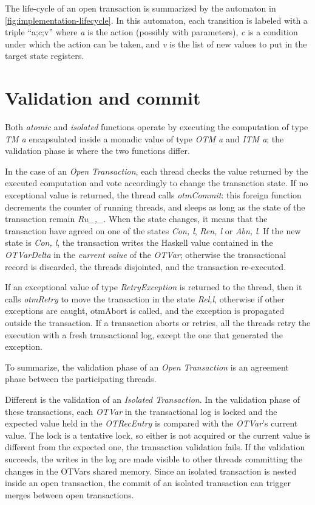 The life-cycle of an open transaction is summarized by the automaton in \cref{fig:implementation-lifecycle}.
In this automaton, each transition is labeled with a triple ``a;c;v'' where \emph{a} is the action (possibly with parameters), \emph{c} is a condition under which the action can be taken, and \emph{v} is the list of new values to put in the target state registers.



\section{Validation and commit}

Both \emph{atomic} and \emph{isolated} functions operate by executing the computation of type \emph{TM a} encapsulated inside a monadic value of type \emph{OTM a} and \emph{ITM a}; the validation phase is where the two functions differ.

In the case of an \emph{Open Transaction}, each thread checks the value returned by the executed computation and vote accordingly to change the transaction state.
If no exceptional value is returned, the thread calls \emph{otmCommit}: this foreign function decrements the counter of running threads, and sleeps as long as the state of the transaction remain \emph{Ru\textlangle \_,\_\textrangle}.
When the state changes, it means that the transaction have agreed on one of the states \emph{Co\textlangle n, l\textrangle}, \emph{Re\textlangle n, l\textrangle} or \emph{Ab\textlangle n, l\textrangle}.
If the new state is \emph{Co\textlangle n, l\textrangle}, the transaction writes the Haskell value contained in the \emph{OTVarDelta} in the \emph{current value} of the \emph{OTVar}; otherwise the transactional record is discarded, the threads disjointed, and the transaction re-executed.

If an exceptional value of type \emph{RetryException} is returned to the thread, then it calls \emph{otmRetry} to move the transaction in the state \emph{Re\textlangle l,l\textrangle}, otherwise if other exceptions are caught, otmAbort is called, and the exception is propagated outside the transaction. If a transaction aborts or retries, all the threads retry the execution with a fresh transactional log, except the one that generated the exception.

To summarize, the validation phase of an \emph{Open Transaction} is an agreement phase between the participating threads.

Different is the validation of an \emph{Isolated Transaction}.
In the validation phase of these transactions, each \emph{OTVar} in the transactional log is locked and the expected value held in the \emph{OTRecEntry} is compared with the \emph{OTVar}'s current value.
The lock is a tentative lock, so either is not acquired or the current value is different from the expected one, the transaction validation fails.
If the validation succeeds, the writes in the log are made visible to other threads committing the changes in the OTVars shared memory. Since an isolated transaction is nested inside an open transaction, the commit of an isolated transaction can trigger merges between open transactions.

